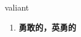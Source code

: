 
\begin{frame}
{\huge valiant}
\begin{center}
\begin{enumerate}\Large
  \item \textbf{勇敢的，英勇的}
\end{enumerate}
\end{center}
\end{frame}
